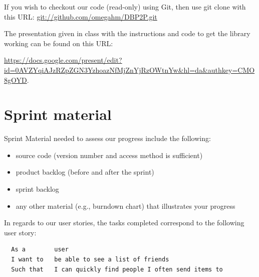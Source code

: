 \documentclass[a4paper,11pt]{article}
\begin{document}
If you wish to checkout our code (read-only) using Git, then use git clone with this URL:
\url{git://github.com/omegahm/DBP2P.git}

The presentation given in class with the instructions and code to get the library working can be found on this URL:

\noindent \url{https://docs.google.com/present/edit?id=0AVZYqiAJzRZpZGN3YzhoazNfMjZnYjRzOWtnYw&hl=da&authkey=CMO8gOYD}.


\section{Sprint material}
Sprint Material needed to assess our progress include the following:
\begin{itemize}
\item source code (version number and access method is sufficient)
\item product backlog (before and after the sprint)
\item sprint backlog
\item any other material (e.g., burndown chart) that illustrates your progress
\end{itemize}




In regards to our user stories, the tasks completed correspond to the following user story:
\begin{verbatim}
  As a        user
  I want to   be able to see a list of friends
  Such that   I can quickly find people I often send items to
\end{verbatim}
\end{document}
